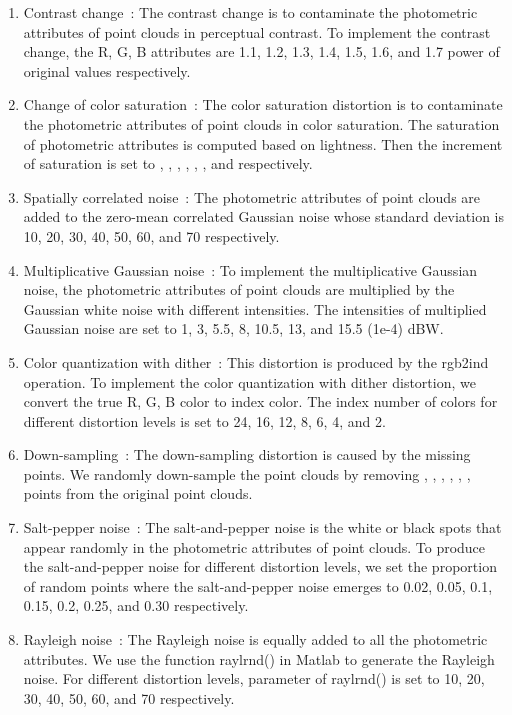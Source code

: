 \documentclass[acmsmall]{acmart}
\begin{document}
\begin{enumerate}
  \item {\sf Contrast change~\cite{Ponomarenko2015TID2013}}: The contrast change is to contaminate the photometric attributes of point clouds in perceptual contrast. To implement the contrast change, the R, G, B attributes are 1.1, 1.2, 1.3, 1.4, 1.5, 1.6, and 1.7 power of original values respectively.
  \item {\sf Change of color saturation~\cite{Ponomarenko2015TID2013}}:  The color saturation distortion is to contaminate the photometric attributes of point clouds in color saturation. The saturation of photometric attributes is computed based on lightness. Then the increment of saturation is set to , , , , , , and  respectively.
  \item {\sf Spatially correlated noise~\cite{Ponomarenko2015TID2013}}: The photometric attributes of point clouds are added to the zero-mean correlated Gaussian noise whose standard deviation is 10, 20, 30, 40, 50, 60, and 70 respectively.
  \item {\sf Multiplicative Gaussian noise~\cite{Ponomarenko2015TID2013}}: To implement the multiplicative Gaussian noise, the photometric attributes of point clouds are multiplied by the Gaussian white noise with different intensities. The intensities of multiplied Gaussian noise are set to 1, 3, 5.5, 8, 10.5, 13, and 15.5 (1e-4) dBW.
  \item {\sf Color quantization with dither~\cite{Boyat2015ImageNoise,Ponomarenko2015TID2013}}: This distortion is produced by the rgb2ind operation. To implement the color quantization with dither distortion, we convert the true R, G, B color to index color. The index number of colors for different distortion levels is set to 24, 16, 12, 8, 6, 4, and 2.
  \item {\sf Down-sampling~\cite{Ponomarenko2015TID2013,Yang2020TMM3DTO2D}}: The down-sampling distortion is caused by the missing points. We randomly down-sample the point clouds by removing , , , , , ,  points from the original point clouds.
  \item {\sf Salt-pepper noise~\cite{Boyat2015ImageNoise,Ponomarenko2015TID2013}}: The salt-and-pepper noise is the white or black spots that appear randomly in the photometric attributes of point clouds. To produce the salt-and-pepper noise for different distortion levels, we set the proportion of random points where the salt-and-pepper noise emerges to 0.02, 0.05, 0.1, 0.15, 0.2, 0.25, and 0.30 respectively.
  \item {\sf Rayleigh noise~\cite{Boyat2015ImageNoise}}: The Rayleigh noise is equally added to all the photometric attributes. We use the function raylrnd() in Matlab to generate the Rayleigh noise. For different distortion levels, parameter  of raylrnd() is set to 10, 20, 30, 40, 50, 60, and 70 respectively.

\end{enumerate}
\end{document}
